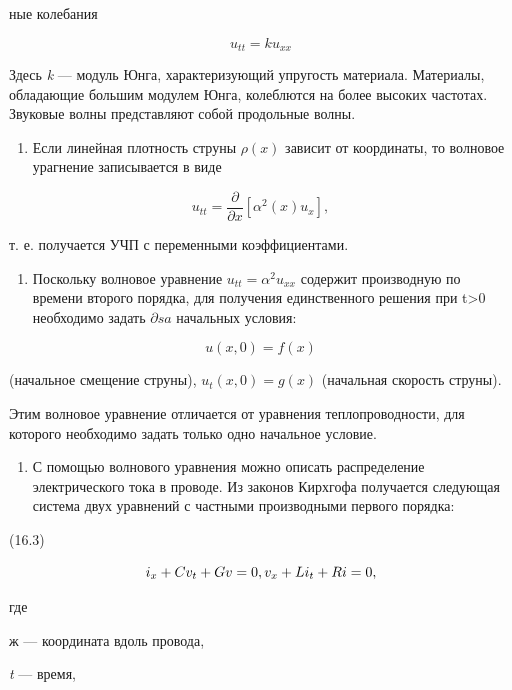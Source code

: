 \documentclass[
  ukrainian,
]{article}
\providecommand{\tightlist}{%
  \setlength{\itemsep}{0pt}\setlength{\parskip}{0pt}}
\begin{document}
ные колебания

\[
u_{tt} = ku_{xx}
\]

Здесь \emph{k} --- модуль Юнга, характеризующий упругость материала.
Материалы, обладающие большим модулем Юнга, колеблются на более высоких
частотах. Звуковые волны представляют собой продольные волны.

\begin{enumerate}
\def\labelenumi{\arabic{enumi}.}
\setcounter{enumi}{1}
\tightlist
\item
  Если линейная плотность струны \(\rho(x)\) зависит от координаты, то
  волновое урагнение записывается в виде
\end{enumerate}

\[
u_{tt} = \frac{\partial}{\partial x} [\alpha^2(x) u_x],
\]

т. е. получается УЧП с переменными коэффициентами.

\begin{enumerate}
\def\labelenumi{\arabic{enumi}.}
\setcounter{enumi}{2}
\tightlist
\item
  Поскольку волновое уравнение \(u_{tt} = \alpha^2 u_{xx}\) содержит
  производную по времени второго порядка, для получения единственного
  решения при t\textgreater0 необходимо задать \(\partial sa\) начальных
  условия:
\end{enumerate}

\[
u(x, 0) = f(x)
\]

(начальное смещение струны), \(u_t(x, 0) = g(x)\) (начальная скорость
струны).

Этим волновое уравнение отличается от уравнения теплопроводности, для
которого необходимо задать только одно начальное условие.

\begin{enumerate}
\def\labelenumi{\arabic{enumi}.}
\setcounter{enumi}{3}
\tightlist
\item
  С помощью волнового уравнения можно описать распределение
  электрического тока в проводе. Из законов Кирхгофа получается
  следующая система двух уравнений с частными производными первого
  порядка:
\end{enumerate}

(16.3)

\[
i_x + Cv_t + Gv = 0, \\ v_x + Li_t + Ri = 0,
\]

где

ж --- координата вдоль провода,

\emph{t} --- время,
\end{document}
